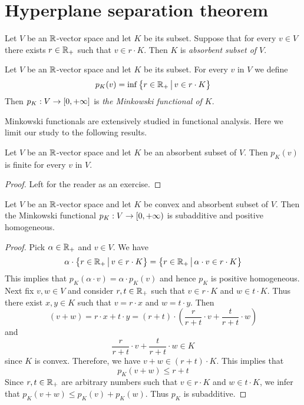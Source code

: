 \section{Hyperplane separation theorem}

\begin{definition}
Let $V$ be an ${\mathbb R}$-vector space and let $K$ be its subset. Suppose that for every $v \in V$ there exists $r\in {\mathbb R}_+$ such that $v\in r\cdot K$. Then $K$ is \textit{absorbent subset of $V$}.
\end{definition}

\begin{definition}
Let $V$ be an ${\mathbb R}$-vector space and let $K$ be its subset. For every $v$ in $V$ we define
$$p_K(v) = \inf\big\{r\in {\mathbb R}_+\,\big|\,v \in r\cdot K\big\}$$
Then $p_K:V\rightarrow [0,+\infty]$ is \textit{the Minkowski functional of $K$}.
\end{definition}
\noindent
Minkowski functionals are extensively studied in functional analysis. Here we limit our study to the following results.

\begin{fact}\label{fact:minkowski_functionals_of_absorbent_subsets_are_finite}
Let $V$ be an ${\mathbb R}$-vector space and let $K$ be an absorbent subset of $V$. Then $p_K(v)$ is finite for every $v$ in $V$.
\end{fact}
\begin{proof}
Left for the reader as an exercise.
\end{proof}

\begin{proposition}\label{proposition:minkowski_functional_of_convex_and_absorbent_subset}
Let $V$ be an ${\mathbb R}$-vector space and let $K$ be convex and absorbent subset of $V$. Then the Minkowski functional $p_K:V\rightarrow [0,+\infty)$ is subadditive and positive homogeneous. 
\end{proposition}
\begin{proof}
Pick $\alpha \in {\mathbb R}_+$ and $v \in V$. We have
$$\alpha \cdot \big\{r\in {\mathbb R}_+\,\big|\,v \in r\cdot K\big\} = \big\{r\in {\mathbb R}_+\,\big|\,\alpha\cdot v \in r\cdot K\big\}$$
This implies that $p_K\left(\alpha \cdot v\right) = \alpha \cdot p_K(v)$ and hence $p_K$ is positive homogeneous.\\
Next fix $v,w\in V$ and consider $r, t\in {\mathbb R}_+$ such that $v\in r\cdot K$ and $w \in t\cdot K$. Thus there exist $x,y\in K$ such that $v = r\cdot x$ and $w = t\cdot y$. Then
$$(v + w) = r\cdot x + t\cdot y = (r + t)\cdot \left(\frac{r}{r+t}\cdot v + \frac{t}{r+t}\cdot w\right)$$
and
$$\frac{r}{r+t}\cdot v + \frac{t}{r+t}\cdot w \in K$$
since $K$ is convex. Therefore, we have $v+w \in (r+t)\cdot K$. This implies that
$$p_K(v+w) \leq r+t$$
Since $r,t\in {\mathbb R}_+$ are arbitrary numbers such that $v\in r\cdot K$ and $w \in t\cdot K$, we infer that $p_K(v+w) \leq p_K(v) + p_K(w)$. Thus $p_K$ is subadditive.
\end{proof}

